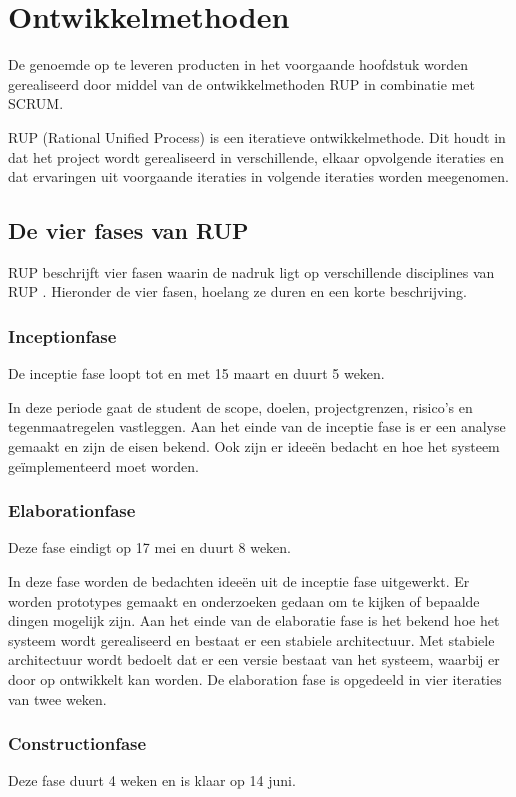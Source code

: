 \documentclass[a4paper, 11pt, oneside]{report}
\begin{document}
\chapter{Ontwikkelmethoden}
\label{chapter:ontwikkelmethode}
De genoemde op te leveren producten in het voorgaande hoofdstuk worden gerealiseerd door middel van de ontwikkelmethoden RUP in combinatie met SCRUM.

RUP (Rational Unified Process) is een iteratieve ontwikkelmethode. Dit houdt in dat het project
wordt gerealiseerd in verschillende, elkaar opvolgende iteraties en dat ervaringen uit voorgaande iteraties in volgende iteraties worden meegenomen.\cite{RUP}

\section{De vier fases van RUP}
\label{sec:fasesRUP}
RUP beschrijft vier fasen waarin de nadruk ligt op verschillende disciplines van RUP \cite{RUPwim}.
Hieronder de vier fasen, hoelang ze duren en een korte beschrijving.

\subsection{Inceptionfase}
\label{sec:inceptionfase}
De inceptie fase loopt tot en met 15 maart en duurt 5 weken.

In deze periode gaat de student de scope, doelen, projectgrenzen, risico's en tegenmaatregelen vastleggen.
Aan het einde van de inceptie fase is er een analyse gemaakt en zijn de eisen bekend.
Ook zijn er ideeën bedacht en hoe het systeem geïmplementeerd moet worden.

\subsection{Elaborationfase}
\label{sec:elaborationfase}
Deze fase eindigt op 17 mei  en duurt 8 weken.

In deze fase worden de bedachten ideeën uit de inceptie fase uitgewerkt.
Er worden prototypes gemaakt en onderzoeken gedaan om te kijken of bepaalde dingen mogelijk zijn.
Aan het einde van de elaboratie fase is het bekend hoe het systeem wordt gerealiseerd en bestaat er een stabiele architectuur.
Met stabiele architectuur wordt bedoelt dat er een versie bestaat van het systeem, waarbij er door op ontwikkelt kan worden.
De elaboration fase is opgedeeld in vier iteraties van twee weken.

\subsection{Constructionfase}
\label{sec:constructionfase}
Deze fase duurt 4 weken en is klaar op 14 juni.
\end{document}
